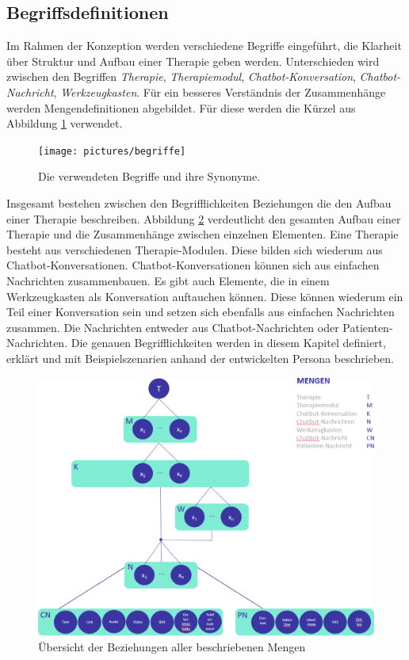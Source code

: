 \subsection{Begriffsdefinitionen}

Im Rahmen der Konzeption werden verschiedene Begriffe eingeführt, die Klarheit über Struktur und Aufbau einer Therapie geben werden. Unterschieden wird zwischen den Begriffen \emph{Therapie}, \emph{Therapiemodul}, \emph{Chatbot-Konversation}, \emph{Chatbot-Nachricht}, \emph{Werkzeugkasten}. Für ein besseres Verständnis der Zusammenhänge werden Mengendefinitionen abgebildet. Für diese werden die Kürzel aus Abbildung \ref{begriffe} verwendet.


\begin{figure}[h]
	\centering
	\texttt{[image: pictures/begriffe]}
	\caption{Die verwendeten Begriffe und ihre Synonyme.}
	\label{begriffe}
\end{figure}

Insgesamt bestehen zwischen den Begrifflichkeiten Beziehungen die den Aufbau einer Therapie beschreiben. Abbildung \ref{mengeninsg} verdeutlicht den gesamten Aufbau einer Therapie und die Zusammenhänge zwischen einzelnen Elementen. Eine Therapie besteht aus verschiedenen Therapie-Modulen. Diese bilden sich wiederum aus Chatbot-Konversationen. Chatbot-Konversationen können sich aus einfachen Nachrichten zusammenbauen. Es gibt auch Elemente, die in einem Werkzeugkasten als Konversation auftauchen können. Diese können wiederum ein Teil einer Konversation sein und setzen sich ebenfalls aus einfachen Nachrichten zusammen. Die Nachrichten entweder aus Chatbot-Nachrichten oder Patienten-Nachrichten. Die genauen Begrifflichkeiten werden in diesem Kapitel definiert, erklärt und mit Beispielszenarien anhand der entwickelten Persona beschrieben.

\begin{figure}[h]
	\centering
	\includegraphics[width=.75\textwidth]{pictures/mengeninsg}
	\caption{Übersicht der Beziehungen aller beschriebenen Mengen}
	\label{mengeninsg}
\end{figure}

